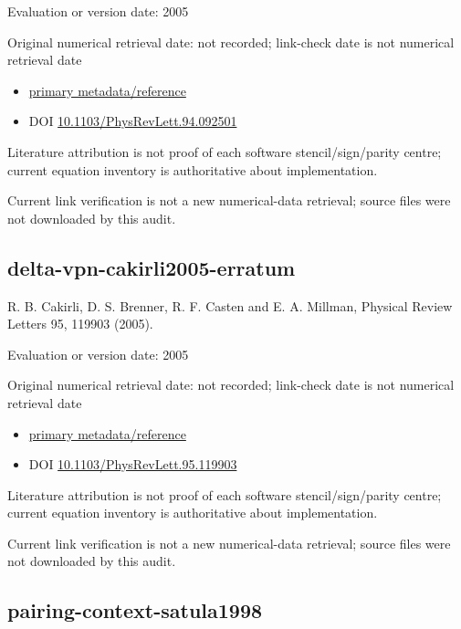 \documentclass[
  11pt,
  letterpaper,
]{article}
\providecommand{\tightlist}{%
  \setlength{\itemsep}{0pt}\setlength{\parskip}{0pt}}
\begin{document}
Evaluation or version date: 2005

Original numerical retrieval date: not recorded; link-check date is not
numerical retrieval date

\begin{itemize}
\tightlist
\item
  \href{https://journals.aps.org/prl/abstract/10.1103/PhysRevLett.94.092501}{primary
  metadata/reference}
\item
  DOI
  \href{https://doi.org/10.1103/PhysRevLett.94.092501}{10.1103/PhysRevLett.94.092501}
\end{itemize}

Literature attribution is not proof of each software stencil/sign/parity
centre; current equation inventory is authoritative about
implementation.

Current link verification is not a new numerical-data retrieval; source
files were not downloaded by this audit.

\subsection{delta-vpn-cakirli2005-erratum}\label{delta-vpn-cakirli2005-erratum}

R. B. Cakirli, D. S. Brenner, R. F. Casten and E. A. Millman, Physical
Review Letters 95, 119903 (2005).

Evaluation or version date: 2005

Original numerical retrieval date: not recorded; link-check date is not
numerical retrieval date

\begin{itemize}
\tightlist
\item
  \href{https://journals.aps.org/prl/abstract/10.1103/PhysRevLett.95.119903}{primary
  metadata/reference}
\item
  DOI
  \href{https://doi.org/10.1103/PhysRevLett.95.119903}{10.1103/PhysRevLett.95.119903}
\end{itemize}

Literature attribution is not proof of each software stencil/sign/parity
centre; current equation inventory is authoritative about
implementation.

Current link verification is not a new numerical-data retrieval; source
files were not downloaded by this audit.

\subsection{pairing-context-satula1998}\label{pairing-context-satula1998}
\end{document}
